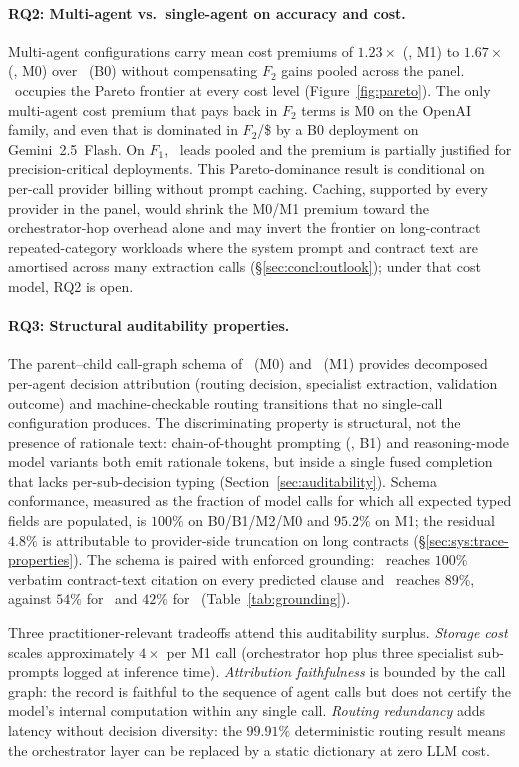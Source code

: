 \paragraph{RQ2: Multi-agent vs.\ single-agent on accuracy and cost.}
Multi-agent configurations carry mean cost premiums of $1.23\times$
(\cfgMA, M1) to $1.67\times$ (\cfgCX, M0) over \cfgZS\ (B0) without
compensating $F_2$ gains pooled across the panel. \cfgZS\ occupies the Pareto
frontier at every cost level (Figure~\ref{fig:pareto}). The only multi-agent
cost premium that pays back in $F_2$ terms is M0 on the OpenAI family, and
even that is dominated in $F_2$/\$ by a B0 deployment on Gemini~2.5~Flash.
On $F_1$, \cfgCX\ leads pooled and the premium is partially justified for
precision-critical deployments.
This Pareto-dominance result is conditional on per-call provider billing
without prompt caching. Caching, supported by every provider in the panel,
would shrink the M0/M1 premium toward the orchestrator-hop overhead alone
and may invert the frontier on long-contract repeated-category workloads
where the system prompt and contract text are amortised across many
extraction calls (\S\ref{sec:concl:outlook}); under that cost model, RQ2 is open.

\paragraph{RQ3: Structural auditability properties.}
The parent--child call-graph schema of \cfgCX\ (M0) and \cfgMA\ (M1) provides
decomposed per-agent decision attribution (routing decision, specialist
extraction, validation outcome) and machine-checkable routing transitions
that no single-call configuration produces. The discriminating property is
structural, not the presence of rationale text: chain-of-thought prompting
(\cfgCoT, B1) and reasoning-mode model variants both emit rationale tokens,
but inside a single fused completion that lacks per-sub-decision typing
(Section~\ref{sec:auditability}). Schema conformance, measured as the
fraction of model calls for which all expected typed fields are populated,
is $100\%$ on B0/B1/M2/M0 and $95.2\%$ on M1; the residual $4.8\%$ is
attributable to provider-side truncation on long contracts
(\S\ref{sec:sys:trace-properties}). The schema is paired with enforced
grounding: \cfgMA\ reaches $100\%$ verbatim contract-text citation on every
predicted clause and \cfgCX\ reaches $89\%$, against $54\%$ for \cfgZS\ and
$42\%$ for \cfgCP\ (Table~\ref{tab:grounding}).

Three practitioner-relevant tradeoffs attend this auditability surplus.
\emph{Storage cost} scales approximately $4\times$ per M1 call (orchestrator
hop plus three specialist sub-prompts logged at inference time).
\emph{Attribution faithfulness} is bounded by the call graph: the record is
faithful to the sequence of agent calls but does not certify the model's
internal computation within any single call. \emph{Routing redundancy} adds
latency without decision diversity: the $99.91\%$ deterministic routing
result means the orchestrator layer can be replaced by a static dictionary
at zero LLM cost.

